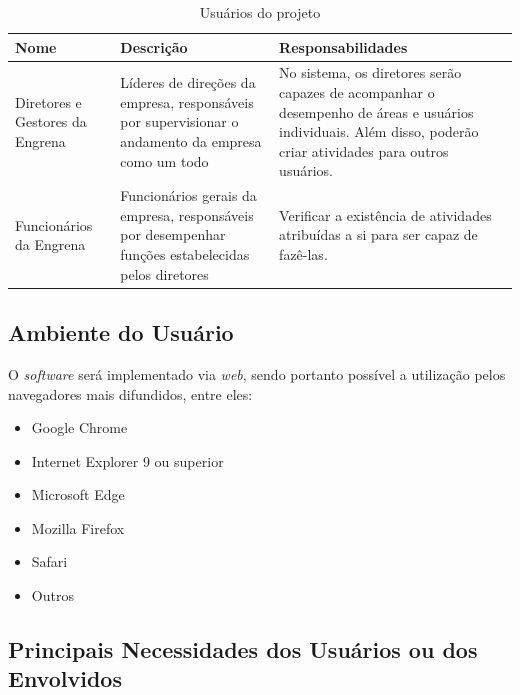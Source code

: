 \begin{apendicesenv}
\begin{table}[!h]
\centering
\caption{Usuários do projeto}
\label{users}
\begin{tabular}{|p{4cm}|p{4cm}|p{4cm}|}
\hline
Nome                            & Descrição                                                                                          & Responsabilidades                                                                                                                                             \\ \hline
Diretores e Gestores da Engrena & Líderes de direções da empresa, responsáveis por supervisionar o andamento da empresa como um todo & No sistema, os diretores serão capazes de acompanhar o desempenho de áreas e usuários individuais. Além disso, poderão criar atividades para outros usuários. \\ \hline
Funcionários da Engrena         & Funcionários gerais da empresa, responsáveis por desempenhar funções estabelecidas pelos diretores & Verificar a existência de atividades atribuídas a si para ser capaz de fazê-las.                                                                              \\ \hline
\end{tabular}
\end{table}

\subsection{Ambiente do Usuário}

O \textit{software} será implementado via \textit{web}, sendo portanto possível a utilização pelos navegadores mais difundidos, entre eles:

\begin{itemize}
\item Google Chrome
\item Internet Explorer 9 ou superior
\item Microsoft Edge
\item Mozilla Firefox
\item Safari
\item Outros
\end{itemize}

\subsection{Principais Necessidades dos Usuários ou dos Envolvidos}


\end{apendicesenv}
